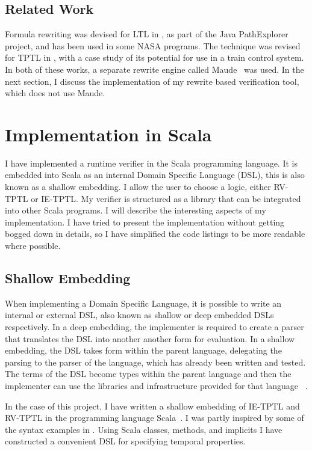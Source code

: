 \documentclass[a4paper]{article}
\begin{document}
\subsection{Related Work}
Formula rewriting was devised for LTL in \textcite{rosu2005rewriting}, as part of the Java PathExplorer project, and has been used in some NASA programs. The technique was revised for TPTL in \textcite{chai2013rewriting}, with a case study of its potential for use in a train control system. In both of these works, a separate rewrite engine called Maude~\autocite{clavel2002maude} was used. In the next section, I discuss the implementation of my rewrite based verification tool, which does not use Maude.

\section{Implementation in Scala}\label{implementaion}
I have implemented a runtime verifier in the Scala programming language.
It is embedded into Scala as an internal Domain Specific Language (DSL), this is also known as a shallow embedding.
I allow the user to choose a logic, either RV-TPTL or IE-TPTL.
My verifier is structured as a library that can be integrated into other Scala programs.
I will describe the interesting aspects of my implementation. I have tried to present the implementation without getting bogged down in details, so I have simplified the code listings to be more readable where possible.

\subsection{Shallow Embedding}
When implementing a Domain Specific Language, it is possible to write an internal or external DSL, also known as shallow or deep embedded DSLs respectively. In a deep embedding, the implementer is required to create a parser that translates the DSL into another another form for evaluation. In a shallow embedding, the DSL takes form within the parent language, delegating the parsing to the parser of the language, which has already been written and tested. The terms of the DSL become types within the parent language and then the implementer can use the libraries and infrastructure provided for that language~
\autocite{gibbons2014foldingdeepshallow}.

In the case of this project, I have written a shallow embedding of IE-TPTL and RV-TPTL in the programming language Scala~\autocite{Odersky04scala}.
I was partly inspired by some of the syntax examples in \textcite{barringer2011tracecontract}.
Using Scala classes, methods, and implicits I have constructed a convenient DSL for specifying temporal properties.
\end{document}
